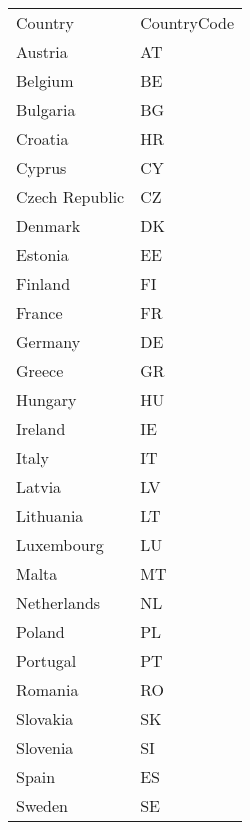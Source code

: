 \begin{tabular}{ll}
Country & CountryCode \\
Austria & AT \\
Belgium & BE \\
Bulgaria & BG \\
Croatia & HR \\
Cyprus & CY \\
Czech Republic & CZ \\
Denmark & DK \\
Estonia & EE \\
Finland & FI \\
France & FR \\
Germany & DE \\
Greece & GR \\
Hungary & HU \\
Ireland & IE \\
Italy & IT \\
Latvia & LV \\
Lithuania & LT \\
Luxembourg & LU \\
Malta & MT \\
Netherlands & NL \\
Poland & PL \\
Portugal & PT \\
Romania & RO \\
Slovakia & SK \\
Slovenia & SI \\
Spain & ES \\
Sweden & SE \\
\end{tabular}
